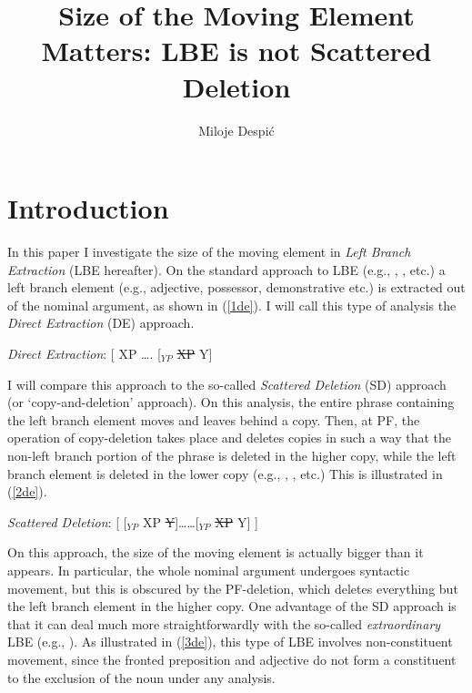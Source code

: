 \documentclass[
    output=paper,
    colorlinks,
    citecolor=brown,
]{langscibook}
\author{Miloje Despić \affiliation{Cornell University}\orcid{}}
\title{Size of the Moving Element Matters: LBE is not Scattered Deletion }
\begin{document}
\maketitle

\section{Introduction}
In this paper I investigate the size of the moving element in \textit{Left Branch Extraction} (LBE hereafter). On the standard approach to LBE (e.g.,
\citeauthor{Riemsdijk1978} \citeyear{Riemsdijk1978}, \citeauthor{Corver1990} \citeyear{Corver1990}, \citeauthor{Bošković2005} \citeyear{Bošković2005} etc.) a left branch element (e.g., adjective, possessor, demonstrative etc.) is extracted out of the nominal argument, as shown in (\ref{1de}). I will call this type of analysis the \textit{Direct Extraction} (DE) approach.

\begin{exe}
\ex \label{1de}
\textit{Direct Extraction}: [  XP …. [$_{YP}$  \sout{XP}  Y]  
\end{exe}

I will compare this approach to the so-called \textit{Scattered Deletion} (SD) approach (or ‘copy-and-deletion’ approach). On this analysis, the entire phrase containing the left branch element moves and leaves behind a copy. Then, at PF, the operation of copy-deletion takes place and deletes copies in such a way that the non-left branch portion of the phrase is deleted in the higher copy, while the left branch element is deleted in the lower copy (e.g., \citeauthor{FanselowĆavar2002} \citeyear{FanselowĆavar2002}, \citeauthor{Pereltsvaig2008} \citeyear{Pereltsvaig2008}, \citeauthor{BondarenkoColin2018} \citeyear{BondarenkoColin2018} etc.) This is illustrated in (\ref{2de}). 

\begin{exe}
\ex \label{2de}
\textit{Scattered Deletion}:  [  [$_{YP}$  XP  \sout{Y}]……[$_{YP}$ \sout{XP}  Y] ]  
\end{exe}

On this approach, the size of the moving element is actually bigger than it appears. In particular, the whole nominal argument undergoes syntactic movement, but this is obscured by the PF-deletion, which deletes everything but the left branch element in the higher copy. One advantage of the SD approach is that it can deal much more straightforwardly with the so-called \textit{extraordinary} LBE (e.g., \citeauthor{Bošković2005} \citeyear{Bošković2005}). As illustrated in (\ref{3de}), this type of LBE involves non-constituent movement, since the fronted preposition and adjective do not form a constituent to the exclusion of the noun under any analysis. 
\end{document}
